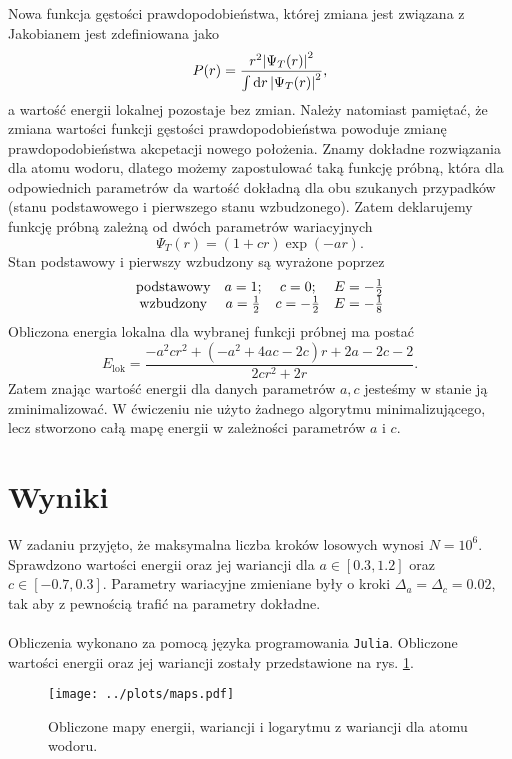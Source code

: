 \documentclass[12pt, a4paper]{article}
\begin{document}
    Nowa funkcja gęstości prawdopodobieństwa, której zmiana jest związana z Jakobianem jest zdefiniowana jako
    \begin{equation}
        P(r) = \frac{r^2\abs{\Psi_T(r)}^2}{\int \dd r \, \abs{\Psi_T(r)}^2},
    \end{equation}
    a wartość energii lokalnej pozostaje bez zmian.
    Należy natomiast pamiętać, że zmiana wartości funkcji gęstości prawdopodobieństwa powoduje zmianę prawdopodobieństwa akcpetacji nowego położenia.
    Znamy dokładne rozwiązania dla atomu wodoru, dlatego możemy zapostulować taką funkcję próbną, która dla odpowiednich parametrów da wartość dokładną dla obu szukanych przypadków (stanu podstawowego i pierwszego stanu wzbudzonego).
    Zatem deklarujemy funkcję próbną zależną od dwóch parametrów wariacyjnych
    \begin{equation}
        \Psi_T(r) = (1 + cr)\exp(-a r).
    \end{equation}
    Stan podstawowy i pierwszy wzbudzony są wyrażone poprzez 
    \begin{equation}
        \begin{array}{c ccc}
           \text{podstawowy} & a = 1; & c = 0; & E = -\frac{1}{2} \\
           \text{wzbudzony} & a = \frac{1}{2} & c = -\frac{1}{2} & E = -\frac{1}{8} 
        \end{array}
    \end{equation}
    Obliczona energia lokalna dla wybranej funkcji próbnej ma postać 
    \begin{equation}
        E_{\text{lok}} = \frac{-a^2cr^2 + (-a^2 + 4ac -2c)r +2a -2c -2}{2cr^2 + 2r}.
    \end{equation}
    Zatem znając wartość energii dla danych parametrów $a,c$ jesteśmy w stanie ją zminimalizować.
    W ćwiczeniu nie użyto żadnego algorytmu minimalizującego, lecz stworzono całą mapę energii w zależności parametrów $a$ i $c$.

    \newpage

    \section*{Wyniki}

    W zadaniu przyjęto, że maksymalna liczba kroków losowych wynosi $N = 10^6$.
    Sprawdzono wartości energii oraz jej wariancji dla $a \in [0.3,1.2]$ oraz $c \in [-0.7,0.3]$. 
    Parametry wariacyjne zmieniane były o kroki $\Delta_a = \Delta_c = 0.02$, tak aby z pewnością trafić na parametry dokładne. 
    \\
    \\
    Obliczenia wykonano za pomocą języka programowania \texttt{Julia}. 
    Obliczone wartości energii oraz jej wariancji zostały przedstawione na rys. \ref{maps}.
    \begin{figure}[H]
        \centering
        \texttt{[image: ../plots/maps.pdf]}
        \caption{Obliczone mapy energii, wariancji i logarytmu z wariancji dla atomu wodoru.}
        \label{maps}
    \end{figure}
\end{document}
